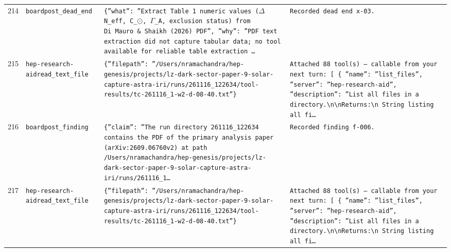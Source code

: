 \documentclass[11pt,a4paper]{article}
\begin{document}
\begin{longtable}{@{}p{}p{}p{}p{}@{}}
214 & \texttt{board}\newline\texttt{post\_\allowbreak{}dead\_\allowbreak{}end} & \texttt{\{''what'':\allowbreak{} ''Extract Table~1 numeric values ($\Delta$N\_\allowbreak{}eff,\allowbreak{} C\_\allowbreak{}$\odot$,\allowbreak{} $\Gamma$\_\allowbreak{}A,\allowbreak{} exclusion status)\allowbreak{} from Di~Mauro \& Shaikh (2026)\allowbreak{} PDF'',\allowbreak{} ''why'':\allowbreak{} ''PDF text extraction did not capture tabular data;\allowbreak{} no tool available for reliable table extraction \ldots{}\allowbreak{}} & \texttt{Recorded dead end x-03.} \\
215 & \texttt{hep-research-aid}\newline\texttt{read\_\allowbreak{}text\_\allowbreak{}file} & \texttt{\{''filepath'':\allowbreak{} ''/\allowbreak{}Users/\allowbreak{}nramachandra/\allowbreak{}hep-genesis/\allowbreak{}projects/\allowbreak{}lz-dark-sector-paper-9-solar-capture-astra-iri/\allowbreak{}runs/\allowbreak{}261116\_\allowbreak{}122634/\allowbreak{}tool-results/\allowbreak{}tc-261116\_\allowbreak{}1-w2-d-08-40.txt''\}\allowbreak{}} & \texttt{Attached 88 tool(s)\allowbreak{} --- callable from your next turn:\allowbreak{} [  \{   ''name'':\allowbreak{} ''list\_\allowbreak{}files'',\allowbreak{}   ''server'':\allowbreak{} ''hep-research-aid'',\allowbreak{}   ''description'':\allowbreak{} ''List all files in a directory.\textbackslash{}\allowbreak{}n\textbackslash{}\allowbreak{}nReturns:\allowbreak{}\textbackslash{}\allowbreak{}n    String listing all fi\ldots{}\allowbreak{}} \\
216 & \texttt{board}\newline\texttt{post\_\allowbreak{}finding} & \texttt{\{''claim'':\allowbreak{} ''The run directory 261116\_\allowbreak{}122634 contains the PDF of the primary analysis paper (arXiv:\allowbreak{}2609.06760v2)\allowbreak{} at path /\allowbreak{}Users/\allowbreak{}nramachandra/\allowbreak{}hep-genesis/\allowbreak{}projects/\allowbreak{}lz-dark-sector-paper-9-solar-capture-astra-iri/\allowbreak{}runs/\allowbreak{}261116\_\allowbreak{}1\ldots{}\allowbreak{}} & \texttt{Recorded finding f-006.} \\
217 & \texttt{hep-research-aid}\newline\texttt{read\_\allowbreak{}text\_\allowbreak{}file} & \texttt{\{''filepath'':\allowbreak{} ''/\allowbreak{}Users/\allowbreak{}nramachandra/\allowbreak{}hep-genesis/\allowbreak{}projects/\allowbreak{}lz-dark-sector-paper-9-solar-capture-astra-iri/\allowbreak{}runs/\allowbreak{}261116\_\allowbreak{}122634/\allowbreak{}tool-results/\allowbreak{}tc-261116\_\allowbreak{}1-w2-d-08-40.txt''\}\allowbreak{}} & \texttt{Attached 88 tool(s)\allowbreak{} --- callable from your next turn:\allowbreak{} [  \{   ''name'':\allowbreak{} ''list\_\allowbreak{}files'',\allowbreak{}   ''server'':\allowbreak{} ''hep-research-aid'',\allowbreak{}   ''description'':\allowbreak{} ''List all files in a directory.\textbackslash{}\allowbreak{}n\textbackslash{}\allowbreak{}nReturns:\allowbreak{}\textbackslash{}\allowbreak{}n    String listing all fi\ldots{}\allowbreak{}} \\

\end{longtable}
\end{document}
